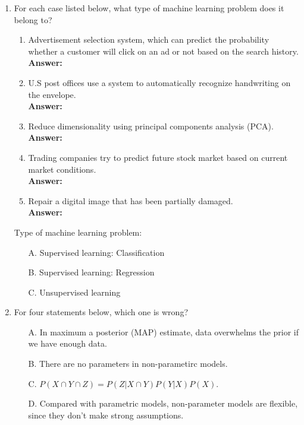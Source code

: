 \documentclass{article}
\begin{document}
\begin{enumerate}
	\item For each case listed below, what type of machine learning problem does it belong to?
	\begin{enumerate}
		\item Advertisement selection system, which can predict the probability whether a customer will click
		on an ad or not based on the search history. \\
		\textbf{Answer:}
		\hspace{3em}
		\item U.S post offices use a system to automatically recognize handwriting on the envelope. \\
		\textbf{Answer:}
		\hspace{3em}
		\item Reduce dimensionality using principal components analysis (PCA). \\
		\textbf{Answer:}
		\hspace{3em}
		\item Trading companies try to predict future stock market based on current market conditions. \\
		\textbf{Answer:}
		\hspace{3em}
		\item Repair a digital image that has been partially damaged. \\
		\textbf{Answer:}
		\hspace{3em}
	\end{enumerate}
	Type of machine learning problem:
	\begin{itemize}
		\item [A.] Supervised learning: Classification
		\item [B.] Supervised learning: Regression
		\item [C.] Unsupervised learning
	\end{itemize}
	\item For four statements below, which one is wrong?
	\begin{itemize}
		\item [A.] In maximum a posterior (MAP) estimate, data overwhelms the prior if we have enough data.
		\item [B.] There are no parameters in non-parametirc models.
		\item [C.] $P(X \cap Y \cap Z)=P(Z|X \cap Y) P(Y|X) P(X)$.
		\item [D.] Compared with parametric models, non-parameter models are flexible, since they don't make strong assumptions.

\end{itemize}
\end{enumerate}
\end{document}
